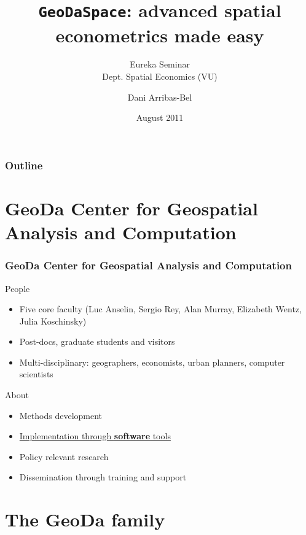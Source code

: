 \documentclass[nototal]{beamer}
\author{Dani Arribas-Bel}
\institute[darribas.org]{GeoDa Center for Geospatial Analysis and Computation (ASU)}
\title[\texttt{GeoDaSpace}]{\texttt{GeoDaSpace}: advanced spatial econometrics made easy}
\subtitle{Eureka Seminar \\ Dept. Spatial Economics (VU)}
\date[08/2011]{August 2011}
\begin{document}
\begin{frame}
  \titlepage
\end{frame}
\begin{frame}
  \frametitle{Outline}
  \tableofcontents[pausesections]
\end{frame}



\section{GeoDa Center for Geospatial Analysis and Computation} 

\begin{frame}
	\frametitle{GeoDa Center for Geospatial Analysis and Computation}
 
\begin{block}{People}
 \begin{itemize}
 \item  Five core faculty (Luc Anselin, Sergio Rey, Alan Murray, Elizabeth Wentz, Julia Koschinsky)
 \item  Post-docs, graduate students and visitors
 \item  Multi-disciplinary: geographers, economists, urban planners, computer scientists
 \end{itemize}
 \end{block} 
\begin{block}{About}
 \begin{itemize}
 \item  Methods development
 \item  \underline{Implementation through \textbf{software} tools}
 \item  Policy relevant research
 \item  Dissemination through training and support
 \end{itemize}
 \end{block} \end{frame} 


\section{The GeoDa family} 
\end{document}
